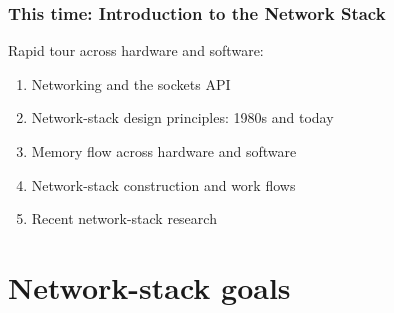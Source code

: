 \begin{frame}
  \frametitle{This time: Introduction to the Network Stack}

  Rapid tour across hardware and software:

  \medskip

  \begin{enumerate}
    \item Networking and the sockets API
    \item Network-stack design principles: 1980s and today
    \item Memory flow across hardware and software
    \item Network-stack construction and work flows
    \item Recent network-stack research
  \end{enumerate}
\end{frame}

\section{Network-stack goals}

